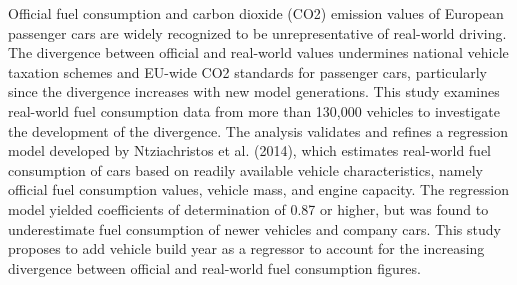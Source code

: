 Official fuel consumption and carbon dioxide (CO2) emission values of European passenger cars are widely recognized to be unrepresentative of real-world driving. The divergence between official and real-world values undermines national vehicle taxation schemes and EU-wide CO2 standards for passenger cars, particularly since the divergence increases with new model generations. This study examines real-world fuel consumption data from more than 130,000 vehicles to investigate the development of the divergence. The analysis validates and refines a regression model developed by Ntziachristos et al. (2014), which estimates real-world fuel consumption of cars based on readily available vehicle characteristics, namely official fuel consumption values, vehicle mass, and engine capacity. The regression model yielded coefficients of determination of 0.87 or higher, but was found to underestimate fuel consumption of newer vehicles and company cars. This study proposes to add vehicle build year as a regressor to account for the increasing divergence between official and real-world fuel consumption figures.